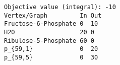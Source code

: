 \begin{verbatim}
Objective value (integral): -10
Vertex/Graph         In Out 
Fructose-6-Phosphate 0  10  
H2O                  20 0   
Ribulose-5-Phosphate 60 0   
p_{59,1}             0  20  
p_{59,5}             0  30  
\end{verbatim}
